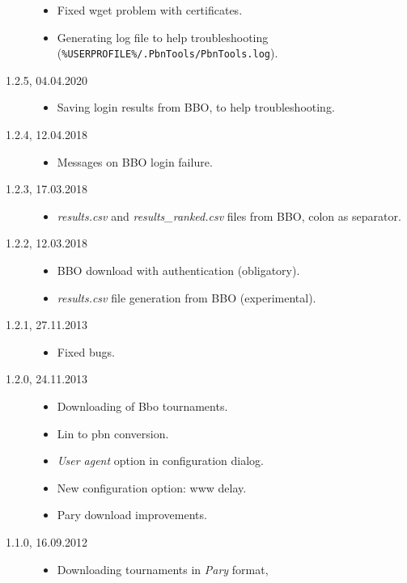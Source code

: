 \documentclass[polish,a4paper,11pt,oneside]{article}
\begin{document}
\begin{description}
  \begin{itemize}
  \item Fixed wget problem with certificates.
  \item Generating log file to help troubleshooting
        (\verb!%USERPROFILE%/.PbnTools/PbnTools.log!).
  \end{itemize}
\item[1.2.5, 04.04.2020]
  \begin{itemize}
  \item Saving login results from BBO, to help troubleshooting.
  \end{itemize}
\item[1.2.4, 12.04.2018]
  \begin{itemize}
  \item Messages on BBO login failure.
  \end{itemize}
\item[1.2.3, 17.03.2018]
  \begin{itemize}
  \item {\em results.csv} and {\em results\_ranked.csv} files from BBO,
        colon as separator.
  \end{itemize}
\item[1.2.2, 12.03.2018]
  \begin{itemize}
  \item BBO download with authentication (obligatory).
  \item {\em results.csv} file generation from BBO (experimental).
  \end{itemize}
\item[1.2.1, 27.11.2013]
  \begin{itemize}
  \item Fixed bugs.
  \end{itemize}
\item[1.2.0, 24.11.2013]
  \begin{itemize}
  \item Downloading of Bbo tournaments.
  \item Lin to pbn conversion.
  \item {\em User agent} option in configuration dialog.
  \item New configuration option: www delay.
  \item Pary download improvements.
  \end{itemize}
\item[1.1.0, 16.09.2012]
  \begin{itemize}
  \item Downloading tournaments in {\em Pary} format,

\end{itemize}
\end{description}
\end{document}
